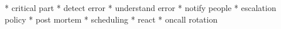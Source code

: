 
* critical part
* detect error
* understand error
* notify people
* escalation policy
* post mortem
* scheduling
* react
* oncall rotation